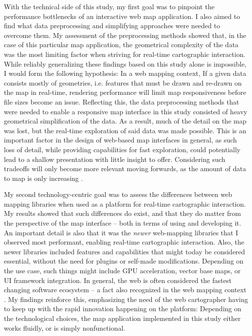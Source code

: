 With the technical side of this study, my first goal was to pinpoint
the performance bottlenecks of
an interactive web map application.
I also aimed to find what data preprocessing and simplifying approaches
were needed to overcome them.
My assessment of the preprocessing methods showed that, in the case of this particular
map application, the geometrical complexity of the data was the most limiting factor
when striving for real-time cartographic interaction.
While reliably generalizing these findings based on this study alone is impossible,
I would form the following hypothesis:
In a web mapping context, If a given data consists mostly of geometries, i.e.
features that must be drawn and re-drawn on the map in real-time,
rendering performance will limit map responsiveness before file sizes become an issue.
Reflecting this,
the data preprocessing methods that were needed
to enable a responsive map interface in this study
consisted of heavy geometrical simplification of the data.
As a result, much of the detail on the map was lost,
but the real-time exploration of said data was made possible.
This is an important factor in the design of
web-based map interfaces in general,
as such loss of detail, while providing capabilities for fast exploration,
could potentially lead to
a shallow presentation with little insight to offer.
Considering such tradeoffs will only become more relevant moving forwards,
as the amount of data to map is only increasing \parencite{kra2017}.

My second technology-centric goal was to assess
the differences between web mapping libraries
when used as a platform for real-time cartographic interaction.
My results showed that such differences do exist,
and that they do matter from the perspective of the map interface --
both in terms of using and developing it.
An important detail is also that
it was the \textit{newer} web-mapping libraries that I observed most performant,
enabling real-time cartographic interaction.
Also, the newer libraries included features and capabilities
that might today be considered essential,
without the need for plugins or self-made modifications.
Depending on the use case, such things might include GPU acceleration,
vector base maps, or UI framework integration.
In general, the web is often considered the fastest changing
software ecosystem \parencite{mik2019, tai2017} --
a fact also recognized in the web mapping context
\parencite{rot2014, vee2017}.
My findings reinforce this, emphasizing the need of the web cartographer
having to keep up with the rapid innovation happening on the platform:
Depending on the technological choices, the map application implemented in this study
either works fluidly, or is simply nonfunctional.

